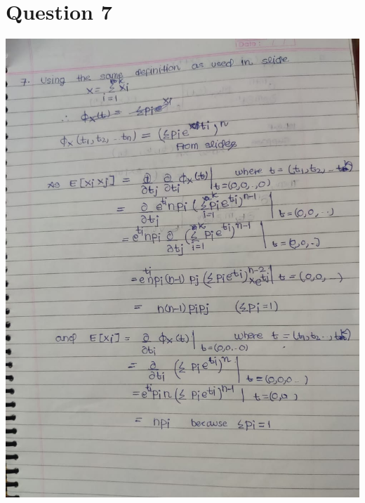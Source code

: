 \documentclass{article}
\theoremstyle{remark}
\begin{document}
\section{Question 7}
\includegraphics[width=\textwidth, height=\textheight, keepaspectratio]{7a.jpeg}\par
\end{document}
